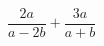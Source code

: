 \begin{ex}[type=expression]
	\begin{condition}
		\( \dfrac{2a}{a-2b}+\dfrac{3a}{a+b} \)
	\end{condition}
\end{ex}